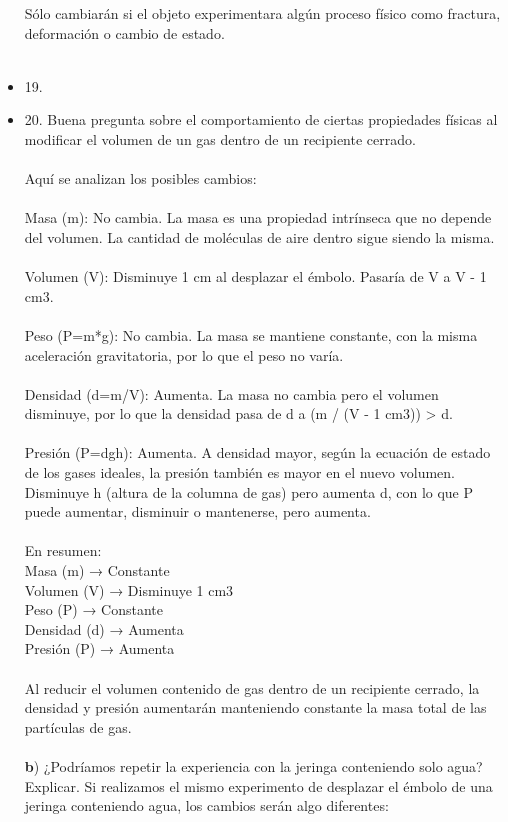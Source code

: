 \documentclass{article}
\begin{document}
\begin{itemize}
Sólo cambiarán si el objeto experimentara algún proceso físico como fractura, deformación o cambio de estado.\\
\\
\item{19.}
\item{20.}
Buena pregunta sobre el comportamiento de ciertas propiedades físicas al modificar el volumen de un gas dentro de un recipiente cerrado.\\
\\
Aquí se analizan los posibles cambios:\\
\\
Masa (m): No cambia. La masa es una propiedad intrínseca que no depende del volumen. La cantidad de moléculas de aire dentro sigue siendo la misma.\\
\\
Volumen (V): Disminuye 1 cm al desplazar el émbolo. Pasaría de V a V - 1 cm3.\\
\\
Peso (P=m*g): No cambia. La masa se mantiene constante, con la misma aceleración gravitatoria, por lo que el peso no varía.\\
\\
Densidad (d=m/V): Aumenta. La masa no cambia pero el volumen disminuye, por lo que la densidad pasa de d a (m / (V - 1 cm3)) > d.\\
\\
Presión (P=dgh): Aumenta. A densidad mayor, según la ecuación de estado de los gases ideales, la presión también es mayor en el nuevo volumen. Disminuye h (altura de la columna de gas) pero aumenta d, con lo que P puede aumentar, disminuir o mantenerse, pero aumenta.\\
\\
En resumen:\\
Masa (m) → Constante\\
Volumen (V) → Disminuye 1 cm3\\
Peso (P) → Constante\\
Densidad (d) → Aumenta\\
Presión (P) → Aumenta\\
\\
Al reducir el volumen contenido de gas dentro de un recipiente cerrado, la densidad y presión aumentarán manteniendo constante la masa total de las partículas de gas.\\
\\
{\textbf b) ¿Podríamos repetir la experiencia con la jeringa conteniendo solo agua? Explicar. }
Si realizamos el mismo experimento de desplazar el émbolo de una jeringa conteniendo agua, los cambios serán algo diferentes:


\end{itemize}
\end{document}

